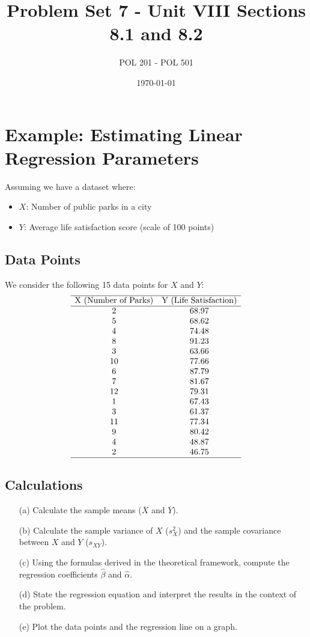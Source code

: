 \documentclass[11pt]{article}
\title{Problem Set 7 - Unit VIII Sections 8.1 and 8.2}
\author{POL 201 - POL 501}
\date{\today}
\begin{document}
\maketitle

\section{Example: Estimating Linear Regression Parameters}

Assuming we have a dataset where:
\begin{itemize}
    \item \(X\): Number of public parks in a city
    \item \(Y\): Average life satisfaction score (scale of 100 points)
\end{itemize}

\subsection*{Data Points}
We consider the following 15 data points for \(X\) and \(Y\):
\[
\begin{array}{cc}
\hline 
    \text{X (Number of Parks)} & \text{Y (Life Satisfaction)} \\ \hline 
    2 & 68.97 \\
    5 & 68.62 \\
    4 & 74.48 \\
    8 & 91.23 \\
    3 & 63.66 \\
    10 & 77.66 \\
    6 & 87.79 \\
    7 & 81.67 \\
    12 & 79.31 \\
    1 & 67.43 \\
    3 & 61.37 \\
    11 & 77.34 \\
    9 & 80.42 \\
    4 & 48.87 \\
    2 & 46.75 \\ \hline 
\end{array}
\]

\subsection*{Calculations}
\begin{itemize}
    \item[(a)] Calculate the sample means (\(\overline{X}\) and \(\overline{Y}\)).
    \item[(b)] Calculate the sample variance of \(X\) (\(s_X^2\)) and the sample covariance between \(X\) and \(Y\) (\(s_{XY}\)).
    \item[(c)] Using the formulas derived in the theoretical framework, compute the regression coefficients \(\hat{\beta}\) and \(\hat{\alpha}\).
    \item[(d)] State the regression equation and interpret the results in the context of the problem.
    \item[(e)] Plot the data points and the regression line on a graph.
\end{itemize}
\end{document}
